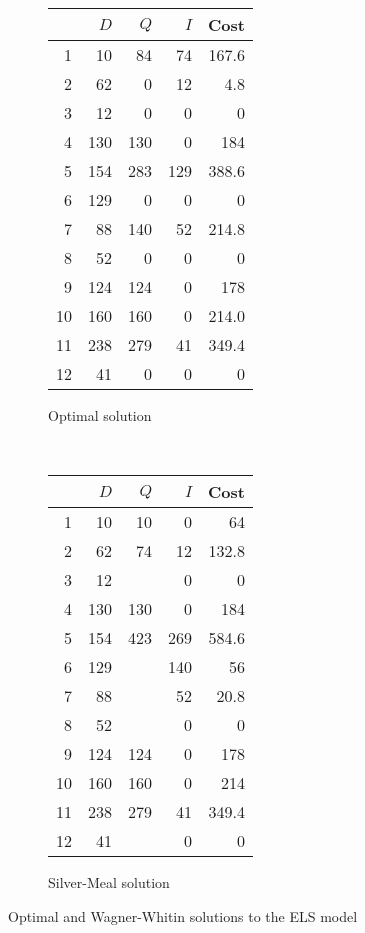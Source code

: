 \begin{solution}
\begin{figure}[htbp]
\begin{subfigure}[b]{0.5\textwidth}
  \centering
    \begin{tabular}{rrrrr}
    \toprule
          & $D$ & $Q$ & $I$ & Cost \\
	\midrule
    1     & 10    & 84    & 74    & 167.6 \\
    2     & 62    & 0     & 12    & 4.8 \\
    3     & 12    & 0     & 0     & 0 \\
    4     & 130   & 130   & 0     & 184 \\
    5     & 154   & 283   & 129   & 388.6 \\
    6     & 129   & 0     & 0     & 0 \\
    7     & 88    & 140   & 52    & 214.8 \\
    8     & 52    & 0     & 0     & 0 \\
    9     & 124   & 124   & 0     & 178 \\
    10    & 160   & 160   & 0     & 214.0 \\
    11    & 238   & 279   & 41    & 349.4 \\
    12    & 41    & 0     & 0     & 0 \\
    \bottomrule
    \end{tabular}%
\caption{Optimal solution}
\label{fig:LS_opt}
\end{subfigure}
~
\begin{subfigure}[b]{0.5\textwidth}
  \centering
    \begin{tabular}{rrrrr}
    \toprule
          & $D$ & $Q$ & $I$ & Cost \\
	\midrule
    1     & 10    & 10    & 0     & 64 \\
    2     & 62    & 74    & 12    & 132.8 \\
    3     & 12    &       & 0     & 0 \\
    4     & 130   & 130   & 0     & 184 \\
    5     & 154   & 423   & 269   & 584.6 \\
    6     & 129   &       & 140   & 56 \\
    7     & 88    &       & 52    & 20.8 \\
    8     & 52    &       & 0     & 0 \\
    9     & 124   & 124   & 0     & 178 \\
    10    & 160   & 160   & 0     & 214 \\
    11    & 238   & 279   & 41    & 349.4 \\
    12    & 41    &       & 0     & 0 \\
    \bottomrule
    \end{tabular}%
\caption{Silver-Meal solution}
\label{fig:LS_SM}
\end{subfigure}
\caption{Optimal and Wagner-Whitin solutions to the ELS model}
\end{figure}
\end{solution}


